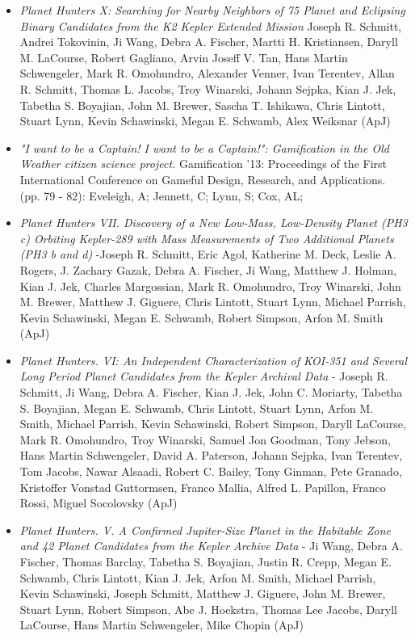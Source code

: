 \documentclass[10pt]{article}
\newenvironment{outerlist}[1][\enskip\textbullet]%
        {\begin{itemize}[#1]}{\end{itemize}%
         \vspace{-.6\baselineskip}}
\begin{document}
\begin{outerlist}
\item[] {\emph{Planet Hunters X: Searching for Nearby Neighbors of 75 Planet and Eclipsing Binary Candidates from the K2 Kepler Extended Mission} Joseph R. Schmitt, Andrei Tokovinin, Ji Wang, Debra A. Fischer, Martti H. Kristiansen, Daryll M. LaCourse, Robert Gagliano, Arvin Joseff V. Tan, Hans Martin Schwengeler, Mark R. Omohundro, Alexander Venner, Ivan Terentev, Allan R. Schmitt, Thomas L. Jacobs, Troy Winarski, Johann Sejpka, Kian J. Jek, Tabetha S. Boyajian, John M. Brewer, Sascha T. Ishikawa, Chris Lintott, Stuart Lynn, Kevin Schawinski, Megan E. Schwamb, Alex Weiksnar (ApJ)}
\item[] {\emph {"I want to be a Captain! I want to be a Captain!": Gamification in the Old Weather citizen science project.} Gamification '13: Proceedings of the First International Conference on Gameful Design, Research, and Applications. (pp. 79 - 82): Eveleigh, A; Jennett, C; Lynn, S; Cox, AL;}

\item[] {\emph{Planet Hunters VII. Discovery of a New Low-Mass, Low-Density Planet (PH3 c) Orbiting Kepler-289 with Mass Measurements of Two Additional Planets (PH3 b and d)} -Joseph R. Schmitt, Eric Agol, Katherine M. Deck, Leslie A. Rogers, J. Zachary Gazak, Debra A. Fischer, Ji Wang, Matthew J. Holman, Kian J. Jek, Charles Margossian, Mark R. Omohundro, Troy Winarski, John M. Brewer, Matthew J. Giguere, Chris Lintott, Stuart Lynn, Michael Parrish, Kevin Schawinski, Megan E. Schwamb, Robert Simpson, Arfon M. Smith (ApJ)}

\item[]{\emph{Planet Hunters. VI: An Independent Characterization of KOI-351 and Several Long Period Planet Candidates from the Kepler Archival Data} - Joseph R. Schmitt, Ji Wang, Debra A. Fischer, Kian J. Jek, John C. Moriarty, Tabetha S. Boyajian, Megan E. Schwamb, Chris Lintott, Stuart Lynn, Arfon M. Smith, Michael Parrish, Kevin Schawinski, Robert Simpson, Daryll LaCourse, Mark R. Omohundro, Troy Winarski, Samuel Jon Goodman, Tony Jebson, Hans Martin Schwengeler, David A. Paterson, Johann Sejpka, Ivan Terentev, Tom Jacobs, Nawar Alsaadi, Robert C. Bailey, Tony Ginman, Pete Granado, Kristoffer Vonstad Guttormsen, Franco Mallia, Alfred L. Papillon, Franco Rossi, Miguel Socolovsky (ApJ)}

\item[] {\emph{Planet Hunters. V. A Confirmed Jupiter-Size Planet in the Habitable Zone and 42 Planet Candidates from the Kepler Archive Data} - Ji Wang, Debra A. Fischer, Thomas Barclay, Tabetha S. Boyajian, Justin R. Crepp, Megan E. Schwamb, Chris Lintott, Kian J. Jek, Arfon M. Smith, Michael Parrish, Kevin Schawinski, Joseph Schmitt, Matthew J. Giguere, John M. Brewer, Stuart Lynn, Robert Simpson, Abe J. Hoekstra, Thomas Lee Jacobs, Daryll LaCourse, Hans Martin Schwengeler, Mike Chopin (ApJ)}


\end{outerlist}
\end{document}

